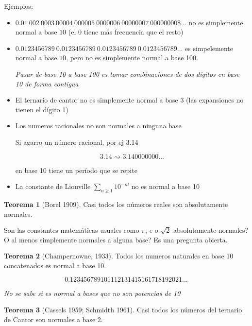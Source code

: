 \documentclass{report}
\theoremstyle{definition} %
\newtheorem{theorem}{Teorema}
\begin{document}
Ejemplos:

\begin{itemize}
    \item $0.01 \ 002 \ 0003 \ 00004 \ 000005 \ 0000006 \ 00000007 \ 000000008 \dots$
    no es simplemente normal a base $10$ (el 0 tiene más frecuencia que el
    resto)
    \item $0.0123456789 \ 0.0123456789 \ 0.0123456789 \ 0.0123456789 \dots$ es
    simpelemente normal a base $10$, pero no es simplemente normal a base 100.

    \textit{Pasar de base 10 a base 100 es tomar combinaciones de dos dígitos en base 10 de forma contigua}

    \item El ternario de cantor no es simplemente normal a base 3 (las
    expansiones no tienen el dígito 1)

    \item Los numeros racionales no son normales a ninguna base
    
    Si agarro un número racional, por ej 3.14

    $$3.14 \rightsquigarrow 3.140000000\dots$$
    
    en base 10 tiene un período que se repite

    \item La constante de Liouville $\sum_{n \geq 1} 10^{-n!}$ no es normal a
    base 10
\end{itemize}

\begin{theorem}[Borel 1909]
    Casi todos los números reales son absolutamente normales.
\end{theorem}

Son las constantes matemáticas usuales como $\pi$, $e$ o $\sqrt{2}$
absolutamente normales? O al menos simplemente normales a alguna base? Es una
pregunta abierta.

\begin{theorem}[Champernowne, 1933]

    Todos los numeros naturales en base 10 concatenados es normal a base 10.

    $$0.123456789101112131415161718192021\dots$$

    \textit{No se sabe si es normal a bases que no son potencias de 10}
    
\end{theorem}

\begin{theorem}[Cassels 1959; Schmidth 1961]
    Casi todos los números del ternario de Cantor son normales a base 2.
\end{theorem}
\end{document}
